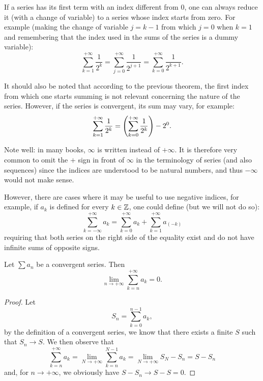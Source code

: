 If a series has its first term with an index different from $0$, one can always
reduce it (with a change of variable) to a series whose index starts from zero.
For example (making the change of variable $j=k-1$ from which $j=0$ when $k=1$
and remembering that the index used in the sums of the series is a dummy
variable):
\[
 \sum_{k=1}^{+\infty} \frac{1}{2^k}
 = \sum_{j=0}^{+\infty} \frac{1}{2^{j+1}}
 = \sum_{k=0}^{+\infty} \frac{1}{2^{k+1}}.
\]

It should also be noted that according to the previous theorem, the first index
from which one starts summing is not relevant concerning the nature of the
series. However, if the series is convergent, its sum may vary, for example:
\[
 \sum_{k=1}^{+\infty} \frac{1}{2^k}
 = {\left( \sum_{k=0}^{+\infty} \frac{1}{2^k} \right)} - 2^0.
\]

Note well: in many books, $\infty$ is written instead of $+\infty$. It is
therefore very common to omit the $+$ sign in front of $\infty$ in the
terminology of series (and also sequences) since the indices are understood to
be natural numbers, and thus $-\infty$ would not make sense.

However, there are cases where it may be useful to use negative indices, for
example, if $a_k$ is defined for every $k\in {\mathbb Z}$, one could define (but we will
not do so):
\[
  \sum_{k=-\infty}^{+\infty} a_k
  = \sum_{k=0}^{+\infty} a_k +
  \sum_{k=1}^{+\infty} a_{(-k)}
\]
requiring that both series on the right side of the equality exist and do not
have infinite sums of opposite signs.

\begin{theorem}
\label{th:coda}%
\mymark{*}%
Let $\sum a_n$ be a convergent series. Then
\[
  \lim_{n\to +\infty} \sum_{k=n}^{+\infty} a_k = 0.
\]
\end{theorem}
%
\begin{proof}
\mymark{*}
Let
\[
  S_n = \sum_{k=0}^{n-1} a_k,
\]
by the definition of a convergent series, we know that there exists a finite $S$
such that $S_n \to S$. We then observe that
\[
  \sum_{k=n}^{+\infty} a_k = \lim_{N\to+\infty} \sum_{k=n}^{N-1} a_k
   = \lim_{N\to +\infty} S_N - S_n = S - S_n
\]
and, for $n\to +\infty$, we obviously have $S - S_n \to S - S = 0$.
\end{proof}